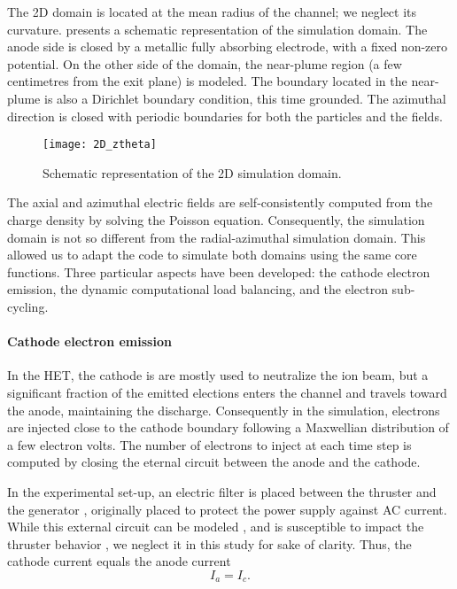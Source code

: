 The \ac{2D} \ztheta domain is located at the mean radius of the channel\string; we neglect its curvature.
 presents a schematic representation of the \ztheta simulation domain.
The anode side is closed by a metallic fully absorbing electrode, with a fixed non-zero potential.
On the other side of the domain, the near-plume region (a few centimetres from the exit plane) is modeled.
The boundary located in the near-plume is also a Dirichlet boundary condition, this time grounded.
The azimuthal direction is closed with periodic boundaries for both the particles and the fields.

\begin{figure}[hbt]
  \centering
  \texttt{[image: 2D\_ztheta]}
  \caption{Schematic representation of the \acs{2D} \ztheta simulation domain.}
  \label{fig-2D_ztheta_bis}
\end{figure}

The axial and azimuthal electric fields are self-consistently computed from the charge density by solving the Poisson equation.
Consequently, the simulation domain is not so different from the radial-azimuthal simulation domain.
This allowed us to adapt the code \LPPic to simulate both domains using the same core functions.
Three particular aspects have been developed\string: the cathode electron emission, the dynamic computational load balancing, and the electron sub-cycling.

\paragraph{Cathode electron emission\\}
In the \ac{HET},  the cathode is are mostly used to neutralize the ion beam, but a significant fraction of the emitted elections enters the channel and travels toward the anode, maintaining the discharge.
Consequently in the simulation, electrons are injected close to the cathode boundary following a Maxwellian distribution of a few electron volts.
The number of electrons to inject at each time step is computed by closing the eternal circuit between the anode and the cathode.

In the experimental set-up, an electric filter is placed between the thruster and the generator \citep{barral2008}, originally placed to protect the power supply against AC current.
While this external circuit can be modeled \citep{verboncoeur1993}, and is susceptible to impact the thruster behavior \citep{barral2008,wei2017}, we neglect it in this study for sake of clarity.
Thus, the cathode current equals the anode current \[ I_a = I_c. \]

